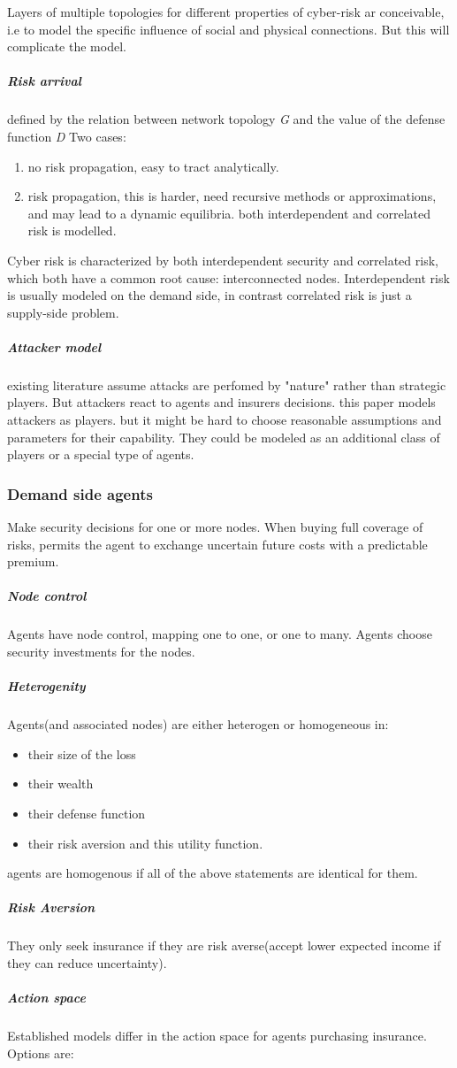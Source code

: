 Layers of multiple topologies for different properties of cyber-risk ar conceivable, 
i.e to model the specific influence of social and physical connections. But this will complicate the model.

\subparagraph{Risk arrival}
defined by the relation between network topology \textit{G} and the value of the defense
 function \textit{D}
 Two cases:
 \begin{enumerate}
 \item no risk propagation, easy to tract analytically.
 \item risk propagation, this is harder, need recursive methods or approximations, 
 and may lead to a dynamic equilibria. both interdependent and correlated risk is modelled. 
 \end{enumerate} 
Cyber risk is characterized by both interdependent security and correlated risk, 
which both have a common root cause: interconnected nodes. 
Interdependent risk is usually modeled on the demand side,
 in contrast correlated risk is just a supply-side problem.

\subparagraph{Attacker model}
existing literature assume attacks are perfomed by "nature" rather than strategic players.
 But attackers react to agents and insurers decisions. this paper models attackers as
  players. but it might be hard to choose reasonable assumptions and parameters for their capability. They could be modeled as an additional class of players or a special type of agents.
\subsubsection{Demand side agents}
Make security decisions for one or more nodes. When buying full coverage of risks, permits
 the agent to exchange uncertain future costs with a predictable premium. 
 \subparagraph{Node control}
 
Agents have node control, mapping one to one, or one to many. Agents choose security investments for the nodes.
\subparagraph{Heterogenity}
 Agents(and associated nodes) are either heterogen or homogeneous in:
\begin{itemize}
\item  their size of the loss
\item  their wealth
\item  their defense function
\item   their risk aversion and this utility function.
\end{itemize}
agents are homogenous if all of the above statements are identical for them.
\subparagraph{Risk Aversion} 
 They only seek insurance if they are risk averse(accept lower expected income if they can reduce uncertainty).
\subparagraph{Action space}
 Established models differ in the action space for agents purchasing insurance.
 Options are:
 
